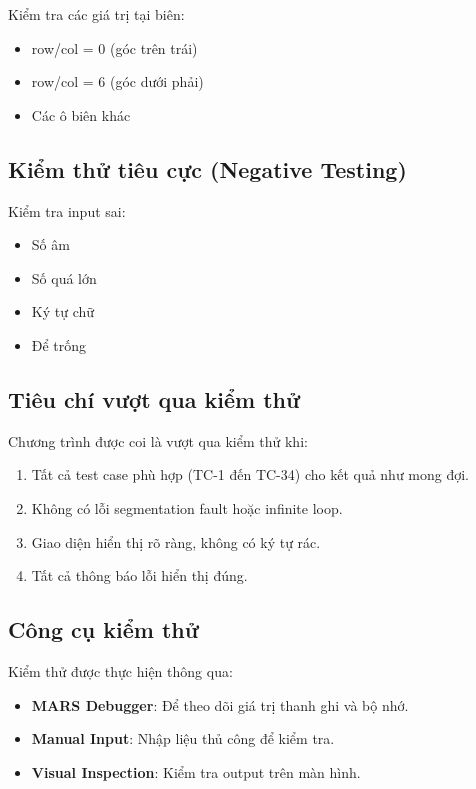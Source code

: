 Kiểm tra các giá trị tại biên:
\begin{itemize}
    \item row/col = 0 (góc trên trái)
    \item row/col = 6 (góc dưới phải)
    \item Các ô biên khác
\end{itemize}

\subsection{Kiểm thử tiêu cực (Negative Testing)}

Kiểm tra input sai:
\begin{itemize}
    \item Số âm
    \item Số quá lớn
    \item Ký tự chữ
    \item Để trống
\end{itemize}

\subsection{Tiêu chí vượt qua kiểm thử}

Chương trình được coi là vượt qua kiểm thử khi:

\begin{enumerate}
    \item Tất cả test case phù hợp (TC-1 đến TC-34) cho kết quả như mong đợi.
    \item Không có lỗi segmentation fault hoặc infinite loop.
    \item Giao diện hiển thị rõ ràng, không có ký tự rác.
    \item Tất cả thông báo lỗi hiển thị đúng.
\end{enumerate}

\subsection{Công cụ kiểm thử}

Kiểm thử được thực hiện thông qua:

\begin{itemize}
    \item \textbf{MARS Debugger}: Để theo dõi giá trị thanh ghi và bộ nhớ.
    \item \textbf{Manual Input}: Nhập liệu thủ công để kiểm tra.
    \item \textbf{Visual Inspection}: Kiểm tra output trên màn hình.
\end{itemize}

